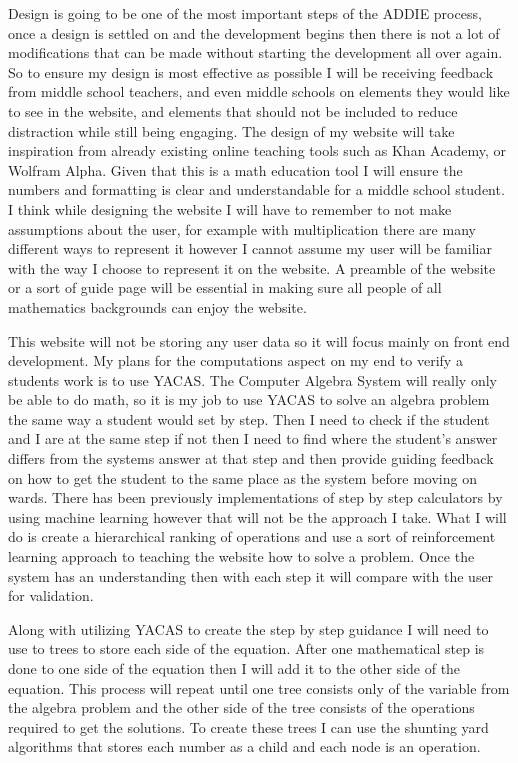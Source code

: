 \documentclass[10pt,twocolumn]{article}
\begin{document}
Design is going to be one of the most important steps of the ADDIE process, once a design is settled on and the development begins then there is not a lot of modifications that can be made without starting the development all over again. So to ensure my design is most effective as possible I will be receiving feedback from middle school teachers, and even middle schools on elements they would like to see in the website, and elements that should not be included to reduce distraction while still being engaging. The design of my website will take inspiration from already existing online teaching tools such as Khan Academy, or Wolfram Alpha. Given that this is a math education tool I will ensure the numbers and formatting is clear and understandable for a middle school student. I think while designing the website I will have to remember to not make assumptions about the user, for example with multiplication there are many different ways to represent it however I cannot assume my user will be familiar with the way I choose to represent it on the website. A preamble of the website or a sort of guide page will be essential in making sure all people of all mathematics backgrounds can enjoy the website. 

This website will not be storing any user data so it will focus mainly on front end development. My plans for the computations aspect on my end to verify a students work is to use YACAS. The Computer Algebra System will really only be able to do math, so it is my job to use YACAS to solve an algebra problem the same way a student would set by step. Then I need to check if the student and I are at the same step if not then I need to find where the student's answer differs from the systems answer at that step and then provide guiding feedback on how to get the student to the same place as the system before moving on wards. There has been previously implementations of step by step calculators by using machine learning however that will not be the approach I take. What I will do is create a hierarchical ranking of operations and use a sort of reinforcement learning approach to teaching the website how to solve a problem. Once the system has an understanding then with each step it will compare with the user for validation. 

Along with utilizing YACAS to create the step by step guidance I will need to use to trees to store each side of the equation. After one mathematical step is done to one side of the equation then I will add it to the other side of the equation. This process will repeat until one tree consists only of the variable from the algebra problem and the other side of the tree consists of the operations required to get the solutions. To create these trees I can use the shunting yard algorithms that stores each number as a child and each node is an operation. 
\end{document}

